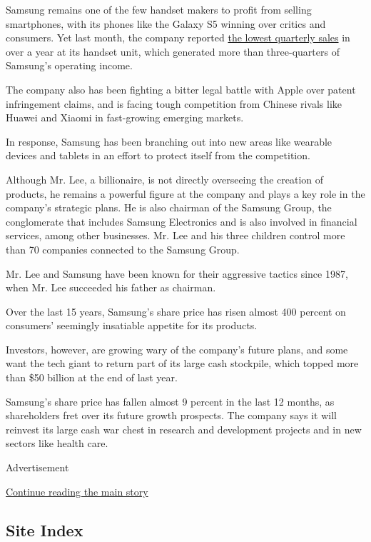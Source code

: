 Samsung remains one of the few handset makers to profit from selling
smartphones, with its phones like the Galaxy S5 winning over critics and
consumers. Yet last month, the company reported
\href{http://www.nytimes3xbfgragh.onion/2014/04/09/business/international/samsung-electronics-hit-by-earnings-decline-as-smartphone-sales-slow.html?_r=0}{the
lowest quarterly sales} in over a year at its handset unit, which
generated more than three-quarters of Samsung's operating income.

The company also has been fighting a bitter legal battle with Apple over
patent infringement claims, and is facing tough competition from Chinese
rivals like Huawei and Xiaomi in fast-growing emerging markets.

In response, Samsung has been branching out into new areas like wearable
devices and tablets in an effort to protect itself from the competition.

Although Mr. Lee, a billionaire, is not directly overseeing the creation
of products, he remains a powerful figure at the company and plays a key
role in the company's strategic plans. He is also chairman of the
Samsung Group, the conglomerate that includes Samsung Electronics and is
also involved in financial services, among other businesses. Mr. Lee and
his three children control more than 70 companies connected to the
Samsung Group.

Mr. Lee and Samsung have been known for their aggressive tactics since
1987, when Mr. Lee succeeded his father as chairman.

Over the last 15 years, Samsung's share price has risen almost 400
percent on consumers' seemingly insatiable appetite for its products.

Investors, however, are growing wary of the company's future plans, and
some want the tech giant to return part of its large cash stockpile,
which topped more than \$50 billion at the end of last year.

Samsung's share price has fallen almost 9 percent in the last 12 months,
as shareholders fret over its future growth prospects. The company says
it will reinvest its large cash war chest in research and development
projects and in new sectors like health care.

Advertisement

\protect\hyperlink{after-bottom}{Continue reading the main story}

\hypertarget{site-index}{%
\subsection{Site Index}\label{site-index}}

